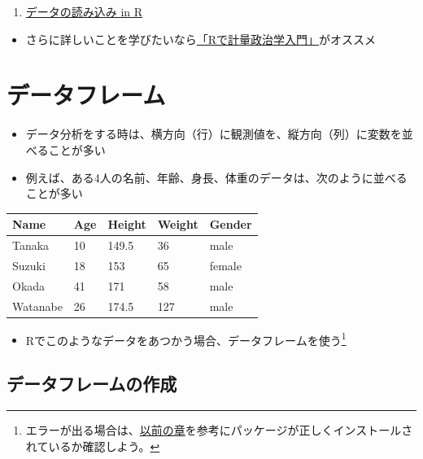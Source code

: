 \documentclass[
]{book}
\providecommand{\tightlist}{%
  \setlength{\itemsep}{0pt}\setlength{\parskip}{0pt}}
\begin{document}
\begin{enumerate}
\def\labelenumi{\arabic{enumi}.}
\tightlist
\item
  \href{https://youtu.be/FugazO_rL7c}{データの読み込み in R}
\end{enumerate}

\begin{itemize}
\tightlist
\item
  さらに詳しいことを学びたいなら\href{https://shohei-doi.github.io/quant_polisci/index.html}{「Rで計量政治学入門」}がオススメ
\end{itemize}

\hypertarget{ux30c7ux30fcux30bfux30d5ux30ecux30fcux30e0}{%
\section{データフレーム}\label{ux30c7ux30fcux30bfux30d5ux30ecux30fcux30e0}}

\begin{itemize}
\tightlist
\item
  データ分析をする時は、横方向（行）に観測値を、縦方向（列）に変数を並べることが多い
\item
  例えば、ある4人の名前、年齢、身長、体重のデータは、次のように並べることが多い
\end{itemize}

\begin{longtable}[]{@{}lllll@{}}
\toprule()
Name & Age & Height & Weight & Gender \\
\midrule()
\endhead
Tanaka & 10 & 149.5 & 36 & male \\
Suzuki & 18 & 153 & 65 & female \\
Okada & 41 & 171 & 58 & male \\
Watanabe & 26 & 174.5 & 127 & male \\
\bottomrule()
\end{longtable}

\begin{itemize}
\tightlist
\item
  Rでこのようなデータをあつかう場合、データフレームを使う\footnote{エラーが出る場合は、\protect\hyperlink{ux30d1ux30c3ux30b1ux30fcux30b8ux306eux30a4ux30f3ux30b9ux30c8ux30fcux30eb}{以前の章}を参考にパッケージが正しくインストールされているか確認しよう。}
\end{itemize}

\hypertarget{ux30c7ux30fcux30bfux30d5ux30ecux30fcux30e0ux306eux4f5cux6210}{%
\subsection{データフレームの作成}\label{ux30c7ux30fcux30bfux30d5ux30ecux30fcux30e0ux306eux4f5cux6210}}
\end{document}
